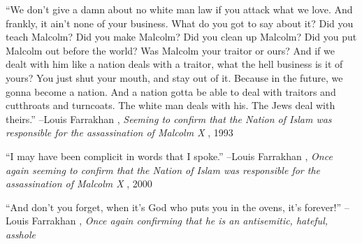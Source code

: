 \documentclass{article}%
\begin{document}
\linebreak%
\vspace{1mm}%
\begin{minipage}{\textwidth}%
\flushleft%
“We don't give a damn about no white man law if you attack what we love. And frankly, it ain't none of your business. What do you got to say about it? Did you teach Malcolm? Did you make Malcolm? Did you clean up Malcolm? Did you put Malcolm out before the world? Was Malcolm your traitor or ours? And if we dealt with him like a nation deals with a traitor, what the hell business is it of yours? You just shut your mouth, and stay out of it. Because in the future, we gonna become a nation. And a nation gotta be able to deal with traitors and cutthroats and turncoats. The white man deals with his. The Jews deal with theirs.”%
\linebreak%
\vspace{1mm}%
–Louis Farrakhan%
, \textit{Seeming to confirm that the Nation of Islam was responsible for the assassination of Malcolm X}%
, 1993%
\linebreak%
\vspace{1mm}%
\end{minipage}%
\linebreak%
\vspace{1mm}%
\begin{minipage}{\textwidth}%
\flushleft%
“I may have been complicit in words that I spoke.”%
\linebreak%
\vspace{1mm}%
–Louis Farrakhan%
, \textit{Once again seeming to confirm that the Nation of Islam was responsible for the assassination of Malcolm X}%
, 2000%
\linebreak%
\vspace{1mm}%
\end{minipage}%
\linebreak%
\vspace{1mm}%
\begin{minipage}{\textwidth}%
\flushleft%
“And don't you forget, when it's God who puts you in the ovens, it's forever!”%
\linebreak%
\vspace{1mm}%
–Louis Farrakhan%
, \textit{Once again confirming that he is an antisemitic, hateful, asshole}%
\linebreak%
\vspace{1mm}%
\end{minipage}%
\linebreak%
\vspace{1mm}%
\end{document}
